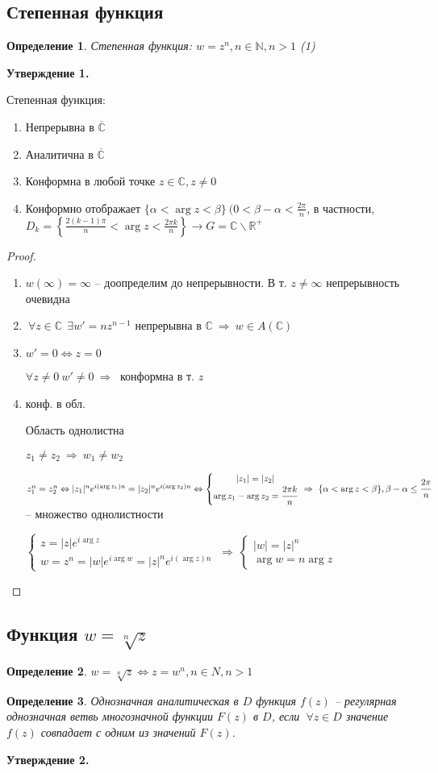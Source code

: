\documentclass[draft]{article}
\newcommand{\forcenewline}{$\phantom{\mbox{newline}}$\newline}
\newcommand{\then}{\ \Rightarrow\ }
\newcommand{\R}{\mathbb{R}}
\renewcommand{\C}{\mathbb{C}}
\newcommand{\N}{\mathbb{N}}
\newcommand{\LRA}{\Leftrightarrow}
\renewcommand{\bar}{\overline}
\renewcommand{\a}{\alpha}
\renewcommand{\b}{\beta}
\newcommand{\E}{\ \exists}
\newcommand{\F}{\ \forall}
\newcommand{\CC}{\bar{\C}}
\newcommand{\sys}[1]{\left\{\begin{matrix}#1\end{matrix}\right.}
\newcommand{\opr}[1]{\begin{opred}#1\end{opred}}
\newtheorem*{opred}{Определение}
\theoremstyle{remark}
\begin{document}
\subsection{Степенная функция}

\opr{Степенная функция: $w=z^n, n\in \N, n>1$ (1)}
{\bfseries Утверждение 1.}

Степенная функция:
\begin{enumerate}
\item Непрерывна в $\CC$
\item Аналитична в $\CC$
\item Конформна в любой точке $z\in\C,z\neq0$
\item Конформно отображает $\{\a<\arg z<\b\}\ (0<\b-\a<\frac{2\pi}{n}$, в частности, $D_k=\left\{\frac{2(k-1)\pi}{n}<\arg z<\frac{2\pi k}{n}\right\}\to G=\C\smallsetminus\R^+$
\end{enumerate}
\begin{proof}
\forcenewline
\begin{enumerate}
\item $w(\infty)=\infty$ -- доопределим до непрерывности. В т. $z\neq\infty$ непрерывность очевидна
\item $\F z\in\C\ \E w'=nz^{n-1}$ непрерывна в $\C\then w\in A(\C)$
\item $w'=0\LRA z=0$

$\forall z\neq0\ w'\neq0\then$ конформна в т. $z$
\item конф. в обл.

Область однолистна

$z_1\neq z_2\then w_1\neq w_2$

$z_1^n=z_2^n\LRA |z_1|^ne^{i(\arg z_1)n}=|z_2|^ne^{i(\arg z_2)n}\LRA\sys{|z_1|=|z_2| \\ \arg z_1-\arg z_2=\cfrac{2\pi k}{n}}\then \{\a<\arg z<\b\}, \b-\a\leq \cfrac{2\pi}{n}$ -- множество однолистности

$\sys{z=|z|e^{i\arg z}\\w=z^n=|w|e^{i\arg w}=|z|^ne^{i(\arg z)n}}\then\sys{|w|=|z|^n \\ \arg w=n\arg z}$
\end{enumerate}
\end{proof}

\subsection{Функция $w=\sqrt[n]{z}$}

\opr{$w=\sqrt[n]{z}\LRA z=w^n,n\in N, n>1$}
\opr{Однозначная аналитическая в $D$ функция $f(z)$ -- регулярная однозначная ветвь многозначной функции $F(z)$ в $D$, если $\F z\in D$ значение $f(z)$ совпадает с одним из значений $F(z)$.}
{\bfseries Утверждение 2.}
\end{document}
